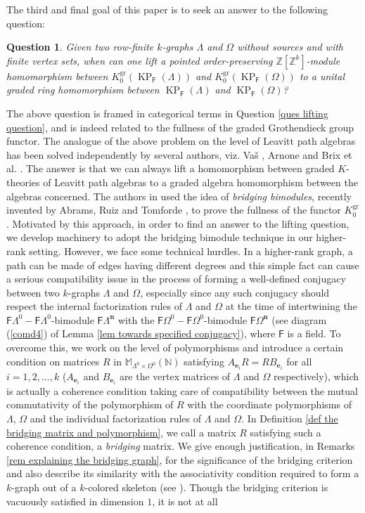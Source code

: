 \documentclass[12pt]{amsart}
\newcommand{\ZZ}{\mathbb{Z}}
\newcommand{\N}{\mathbf{n}}
\newcommand{\KP}{\operatorname{KP}}
\newtheorem{ques}[thm]{Question}
\theoremstyle{definition}
\theoremstyle{remark}
\newcommand{\gr}{\operatorname{gr}}
\begin{document}
The third and final goal of this paper is to seek an answer to the following question:
\begin{ques}\label{ques brief lifting question}
Given two row-finite $k$-graphs $\Lambda$ and $\Omega$ without sources and with finite vertex sets, when can one lift a pointed order-preserving $\ZZ[\ZZ^k]$-module homomorphism between $K_0^{\gr}(\KP_\mathsf{F}(\Lambda))$ and $K_0^{\gr}(\KP_\mathsf{F}(\Omega))$ to a unital graded ring homomorphism between $\KP_\mathsf{F}(\Lambda)$ and $\KP_\mathsf{F}(\Omega)$?
\end{ques}
The above question is framed in categorical terms in Question \ref{ques lifting question}, and is indeed related to the fullness of the graded Grothendieck group functor. The analogue of the above problem on the level of Leavitt path algebras has been solved independently by several authors, viz. Va\v{s} \cite{Vas}, Arnone \cite{Arnone} and Brix et al. \cite{Brix}. The answer is that we can always lift a homomorphism between graded $K$-theories of Leavitt path algebras to a graded algebra homomorphism between the algebras concerned. The authors in \cite{Brix} used the idea of \emph{bridging bimodules}, recently invented by Abrams, Ruiz and Tomforde \cite{ART}, to prove the fullness of the functor $K_0^{\gr}$. Motivated by this approach, in order to find an answer to the lifting question, we develop machinery to adopt the bridging bimodule technique in our higher-rank setting. However, we face some technical hurdles. In a higher-rank graph, a path can be made of edges having different degrees and this simple fact can cause a serious compatibility issue in the process of forming a well-defined conjugacy between two $k$-graphs $\Lambda$ and $\Omega$, especially since any such conjugacy should respect the internal factorization rules of $\Lambda$ and $\Omega$ at the time of intertwining the $\mathsf{F}\Lambda^0-\mathsf{F}\Lambda^0$-bimodule $\mathsf{F}\Lambda^\N$ with the $\mathsf{F}\Omega^0-\mathsf{F}\Omega^0$-bimodule $\mathsf{F}\Omega^\N$ (see diagram (\ref{comd4}) of Lemma \ref{lem towards specified conjugacy}), where $\mathsf{F}$ is a field. To overcome this, we work on the level of polymorphisms and introduce a certain condition on matrices $R$ in $\mathbb{M}_{\Lambda^0\times \Omega^0}(\mathbb{N})$ satisfying $A_{\mathbf{e}_i}R=RB_{\mathbf{e}_i}$ for all $i=1,2,\ldots,k$ ($A_{\mathbf{e}_i}$ and $B_{\mathbf{e}_i}$ are the vertex matrices of $\Lambda$ and $\Omega$ respectively), which is actually a coherence condition taking care of compatibility between the mutual commutativity of the polymorphism of $R$ with the coordinate polymorphisms of $\Lambda$, $\Omega$ and the individual factorization rules of $\Lambda$ and $\Omega$. In Definition \ref{def the bridging matrix and polymorphism}, we call a matrix $R$ satisfying such a coherence condition, a \emph{bridging} matrix. We give enough justification, in Remarks \ref{rem explaining the bridging graph}, for the significance of the bridging criterion and also describe its similarity with the associativity condition required to form a $k$-graph out of a $k$-colored skeleton (see \cite[Theorem 4.4]{Hazlewood}). Though the bridging criterion is vacuously satisfied in dimension $1$, it is not at all 
\end{document}
